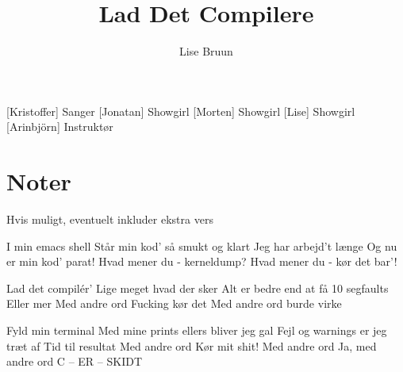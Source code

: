 \documentclass[a4paper,11pt]{article}
\title{Lad Det Compilere}
\author{Lise Bruun}
\begin{document}
\maketitle

\begin{roles}
[Kristoffer] Sanger
[Jonatan] Showgirl
[Morten] Showgirl
[Lise] Showgirl
[Arinbjörn] Instruktør
\end{roles} 

\section*{Noter}
Hvis muligt, eventuelt inkluder ekstra vers

\begin{props}
\prop{}
\prop{}
\prop{}
\prop{}
\prop{}
\prop{}
\end{props}



\begin{song}
 I min emacs shell 
Står min kod’ så smukt og klart
Jeg har arbejd’t længe
Og nu er min kod’ parat!
Hvad mener du - kerneldump?
Hvad mener du - kør det bar’!

Lad det compilér’
Lige meget hvad der sker
Alt er bedre end at få 10 segfaults
Eller mer
Med andre ord
Fucking kør det
Med andre ord
burde virke

Fyld min terminal 
Med mine prints ellers bliver jeg gal
Fejl og warnings er jeg træt af
Tid til resultat
Med andre ord
Kør mit shit!
Med andre ord
Ja, med andre ord
C – ER – SKIDT
\end{song}
\end{document}
